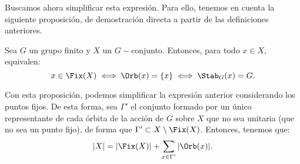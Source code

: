 \begin{ejercicio}
    Buscamos ahora simplificar esta expresión. Para ello, tenemos en cuenta la siguiente proposición, de demostración directa a partir de las definiciones anteriores.
    \begin{prop}
        Sea \(G\) un grupo finito y \(X\) un \(G-\)conjunto. Entonces, para todo \(x\in X\), equivalen:
        \begin{equation*}
            x\in \Fix(X) \iff \Orb(x) = \{x\} \iff \Stab_G(x) = G.
        \end{equation*}
    \end{prop}

    Con esta proposición, podemos simplificar la expresión anterior considerando los puntos fijos. De esta forma, sea $\Gamma'$ el conjunto formado por un único representante de cada órbita de la acción de \(G\) sobre \(X\) que no sea unitaria (que no sea un punto fijo), de forma que $\Gamma'\subset X\setminus \Fix(X)$. Entonces, tenemos que:
    \begin{equation*}
        |X| = |\Fix(X)| + \sum_{x\in \Gamma'} |\Orb(x)|.
    \end{equation*}


\end{ejercicio}
